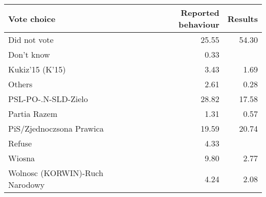 
\begin{tabular}{l|r|r}
\hline
Vote choice & Reported behaviour & Results\\
\hline
Did not vote & 25.55 & 54.30\\
\hline
Don't know & 0.33 & \\
\hline
Kukiz'15 (K'15) & 3.43 & 1.69\\
\hline
Others & 2.61 & 0.28\\
\hline
PSL-PO-.N-SLD-Zielo & 28.82 & 17.58\\
\hline
Partia Razem & 1.31 & 0.57\\
\hline
PiS/Zjednoczsona Prawica & 19.59 & 20.74\\
\hline
Refuse & 4.33 & \\
\hline
Wiosna & 9.80 & 2.77\\
\hline
Wolnosc (KORWIN)-Ruch Narodowy & 4.24 & 2.08\\
\hline
\end{tabular}
